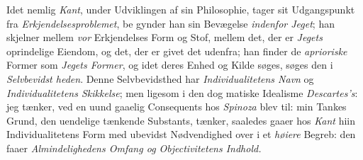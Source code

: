 Idet nemlig \emph{Kant}, under Udviklingen af sin Philosophie,
tager sit Udgangspunkt fra \emph{Erkjendelsesproblemet}, be\-%
gynder han sin Bevægelse \emph{indenfor Jeget}; han skjelner
mellem \emph{vor} Erkjendelses Form og Stof, mellem det, der er
\emph{Jegets} oprindelige Eiendom, og det, der er givet det udenfra;
han finder de \emph{aprioriske} Former som \emph{Jegets Former}, og
idet deres Enhed og Kilde søges, søges den i \emph{Selvbevidst\-%
heden}. Denne Selvbevidsthed har \emph{Individualitetens Navn}
og \emph{Individualitetens Skikkelse}; men ligesom i den dog\-%
matiske Idealisme \emph{Descartes's}: jeg tænker, ved en uund\-%
gaaelig Consequents hos \emph{Spinoza} blev til: min Tankes Grund,
den uendelige tænkende Substants, tænker, saaledes gaaer hos
\emph{Kant} hiin Individualitetens Form med ubevidst Nødvendighed
over i et \emph{høiere} Begreb: den faaer \emph{Almindelighedens
Omfang og Objectivitetens Indhold.}

